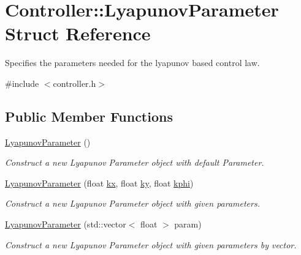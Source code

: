\hypertarget{structController_1_1LyapunovParameter}{}\section{Controller\+:\+:Lyapunov\+Parameter Struct Reference}
\label{structController_1_1LyapunovParameter}


Specifies the parameters needed for the lyapunov based control law.  




{\ttfamily \#include $<$controller.\+h$>$}

\subsection*{Public Member Functions}
\begin{DoxyCompactItemize}
\item 
\hyperlink{structController_1_1LyapunovParameter_ae0d081687dfc7637bfbce3fe4cc2d9dd}{Lyapunov\+Parameter} ()\hypertarget{structController_1_1LyapunovParameter_ae0d081687dfc7637bfbce3fe4cc2d9dd}{}\label{structController_1_1LyapunovParameter_ae0d081687dfc7637bfbce3fe4cc2d9dd}

\begin{DoxyCompactList}\small\item\em Construct a new Lyapunov Parameter object with default Parameter. \end{DoxyCompactList}\item 
\hyperlink{structController_1_1LyapunovParameter_acca8d24226201cd98caa44ccd4ddc4ac}{Lyapunov\+Parameter} (float \hyperlink{structController_1_1LyapunovParameter_a4183bf21c97669dc44d4f67cb9a0d26c}{kx}, float \hyperlink{structController_1_1LyapunovParameter_a4cde698202cddb2fb3971fcc0f0804ca}{ky}, float \hyperlink{structController_1_1LyapunovParameter_a4ffd5e85451097367940acc6536d2a4c}{kphi})
\begin{DoxyCompactList}\small\item\em Construct a new Lyapunov Parameter object with given parameters. \end{DoxyCompactList}\item 
\hyperlink{structController_1_1LyapunovParameter_a5c8cfc9a6c9168848ddce0d15f17ec02}{Lyapunov\+Parameter} (std\+::vector$<$ float $>$ param)
\begin{DoxyCompactList}\small\item\em Construct a new Lyapunov Parameter object with given parameters by vector. \end{DoxyCompactList}\end{DoxyCompactItemize}
